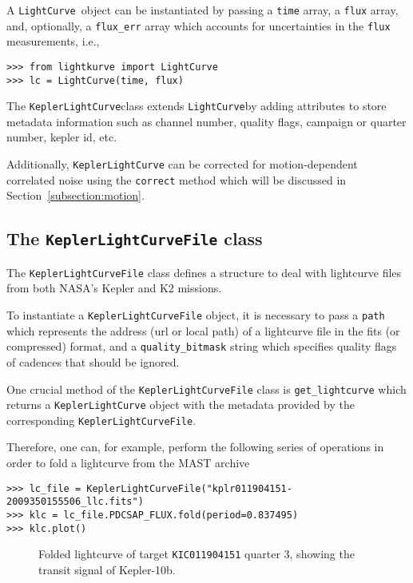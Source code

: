 \documentclass[twocolumn]{aastex62}
\newcommand{\LightCurve}{\texttt{LightCurve}}
\newcommand{\KeplerLightCurve}{\texttt{KeplerLightCurve}}
\begin{document}
        A \LightCurve~object can be instantiated by passing a \texttt{time}
        array, a \texttt{flux} array, and, optionally, a \texttt{flux\_err} array
        which accounts for uncertainties in the \texttt{flux} measurements, i.e.,
\begin{verbatim}
>>> from lightkurve import LightCurve
>>> lc = LightCurve(time, flux)
\end{verbatim}

       The \KeplerLightCurve class extends \LightCurve by
       adding attributes to store metadata information such as channel number,
       quality flags, campaign or quarter number, kepler id, etc.

       Additionally, \texttt{KeplerLightCurve} can be corrected for motion-dependent
       correlated noise using the \texttt{correct} method which will be discussed in
       Section~\ref{subsection:motion}.

   \subsection{The \texttt{KeplerLightCurveFile} class}
        The \texttt{KeplerLightCurveFile} class defines a structure to deal
        with lightcurve files from both NASA's Kepler and K2 missions.

        To instantiate a \texttt{KeplerLightCurveFile} object, it is necessary
        to pass a \texttt{path} which represents the address (url or local path)
        of a lightcurve file in the fits (or compressed) format, and a
        \texttt{quality\_bitmask} string which specifies quality
        flags of cadences that should be ignored.

        One crucial method of the \texttt{KeplerLightCurveFile} class is
        \texttt{get\_lightcurve} which returns a \texttt{KeplerLightCurve} object
        with the metadata provided by the corresponding \texttt{KeplerLightCurveFile}.

        Therefore, one can, for example, perform the following series of operations
        in order to fold a lightcurve from the MAST archive
\begin{verbatim}
>>> lc_file = KeplerLightCurveFile("kplr011904151-2009350155506_llc.fits")
>>> klc = lc_file.PDCSAP_FLUX.fold(period=0.837495)
>>> klc.plot()
\end{verbatim}

\begin{figure}
\caption{Folded lightcurve of target \texttt{KIC011904151} quarter 3, showing the
            transit signal of Kepler-10b.
\label{fig:fold-method}}
\end{figure}
\end{document}
